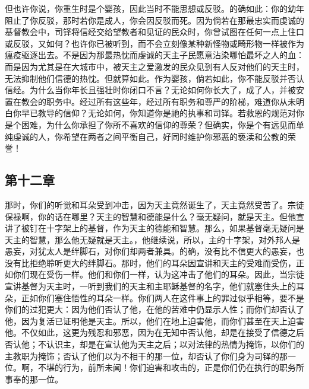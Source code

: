 \par

但也许你说，你重生时是个婴孩，因此当时不能思想或反驳。的确如此：你的幼年阻止了你反驳，那时若你是成人，你会因反驳而死。因为倘若在那最忠实而虔诚的基督教会中，司铎将信经交给望教者和见证的民众时，你曾试图在任何一点上住口或反驳，又如何？也许你已被听到，而不会立刻像某种新怪物或畸形物一样被作为瘟疫驱逐出去。不是因为那最热忱而虔诚的天主子民愿意沾染哪怕最坏之人的血：而是因为尤其是在大城市中，被天主之爱激发的民众见到有人反对他们的天主时，无法抑制他们信德的热忱。但就算如此。作为婴孩，倘若如此，你不能反驳并否认信经。为什么当你年长且强壮时你闭口不言？无论如何你长大了，成了人，并被安置在教会的职务中。经过所有这些年，经过所有职务和尊严的阶梯，难道你从未明白你早已教导的信仰？无论如何，你知道你是祂的执事和司铎。若救恩的规范对你是个困难，为什么你承担了你所不喜欢的信仰的尊荣？但确实，你是个有远见而单纯虔诚的人，你希望在两者之间平衡自己，好同时维护你邪恶的亵渎和公教的荣誉！\par


\subsection{第十二章}

\par

那时，你们的听觉和耳朵受到冲击，因为天主竟然诞生了，天主竟然受苦了。宗徒保禄啊，你的话在哪里？天主的智慧和德能是什么？毫无疑问，就是天主。但他宣讲了被钉在十字架上的基督，作为天主的德能和智慧。那么，如果基督毫无疑问是天主的智慧，那么他无疑就是天主。，他继续说，所以，主的十字架，对外邦人是愚妄，对犹太人是绊脚石，对你们却两者兼具。的确，没有比不信更大的愚妄，也没有比拒绝聆听更大的绊脚石。那时，他们的耳朵因宣讲和天主的受难而受伤，正如你们现在受伤一样。他们和你们一样，认为这冲击了他们的耳朵。因此，当宗徒宣讲基督为天主时，一听到我们的天主和主耶稣基督的名字，他们就塞住头上的耳朵，正如你们塞住悟性的耳朵一样。你们两人在这件事上的罪过似乎相等，要不是你们的过犯更大：因为他们否认了他，在他的苦难中仍显示人性；而你们却否认了他，因为复活已证明他是天主。所以，他们在地上迫害他，而你们甚至在天上迫害他。不仅如此，这更为残忍和邪恶，因为在无知中否认他，却是在接受了信德之后否认他；不认识主，却是在宣认他为天主之后；以对法律的热情为掩饰，以你们的主教职为掩饰；否认了他们以为不相干的那一位，却否认了你们身为司铎的那一位。啊，不堪的行为，前所未闻！你们迫害和攻击的，正是你们仍在执行的职务所事奉的那一位。\par

